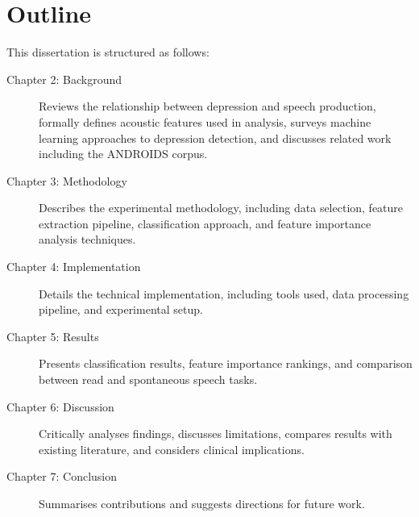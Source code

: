 \section{Outline}

This dissertation is structured as follows:

\begin{description}
    \item[Chapter 2: Background] Reviews the relationship between depression and speech production, formally defines acoustic features used in analysis, surveys machine learning approaches to depression detection, and discusses related work including the ANDROIDS corpus.
    
    \item[Chapter 3: Methodology] Describes the experimental methodology, including data selection, feature extraction pipeline, classification approach, and feature importance analysis techniques.
    
    \item[Chapter 4: Implementation] Details the technical implementation, including tools used, data processing pipeline, and experimental setup.
    
    \item[Chapter 5: Results] Presents classification results, feature importance rankings, and comparison between read and spontaneous speech tasks.
    
    \item[Chapter 6: Discussion] Critically analyses findings, discusses limitations, compares results with existing literature, and considers clinical implications.
    
    \item[Chapter 7: Conclusion] Summarises contributions and suggests directions for future work.
\end{description}
